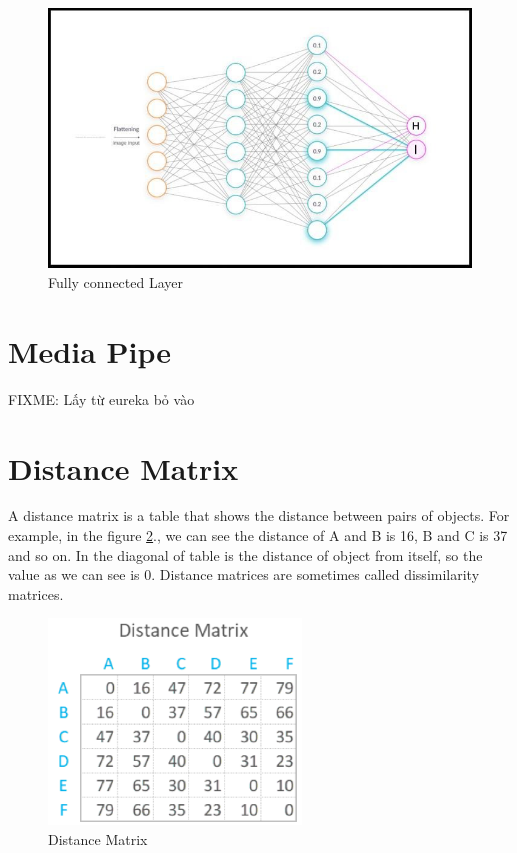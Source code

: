         \begin{figure}[H]
          \centering
          \includegraphics[width=\textwidth]{img/Chap3/FC}
          \caption{ Fully connected Layer}
          \label{fig:Chap3-FC}
        \end{figure}
  \section{ Media Pipe }
    FIXME: Lấy từ eureka bỏ vào


  \section{ Distance Matrix }
    A distance matrix is a table that shows the distance between pairs of objects.
    For example, in the figure \ref{fig:Chap3-DM}., we can see the distance of A and B is 16, B and C is 37
    and so on. In the diagonal of table is the distance of object from itself, so the value
    as we can see is 0. Distance matrices are sometimes called dissimilarity matrices.

    \begin{figure}[H]
      \centering
      \includegraphics[width=0.6\textwidth]{img/Chap3/DM}
      \caption{ Distance Matrix }
      \label{fig:Chap3-DM}
    \end{figure}

